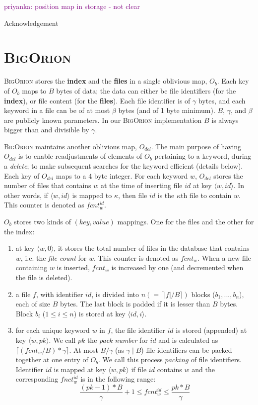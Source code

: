 \documentclass[sigconf]{acmart}
\newcommand{\priyanka}[1]{\textcolor{purple}{priyanka: #1}}
\newcommand{\pair}[2]{{\langle \ensuremath{#1, #2} \rangle}}
\newcommand{\vol}[1]{\lvert{#1}\rvert}
\newcommand{\ceil}[1]{\lceil #1 \rceil}
\newcommand{\BigOrion}{\textsc{BigOrion }}
\begin{document}
\priyanka{position map in storage - not clear}
\appendix


\begin{acks}
Acknowledgement
\end{acks}







\section{\BigOrion}
\BigOrion stores the \textbf{index} and the \textbf{files} in a single oblivious map, $O_{b}$. Each key of $O_{b}$ maps to $B$ bytes of data; the data can either be file identifiers (for the \textbf{index}), or file content (for the \textbf{files}). Each file identifier is of $\gamma$ bytes, and each keyword in a file can be of at most $\beta$ bytes (and of 1 byte minimum). $B$, $\gamma$, and $\beta$ are publicly known parameters. In our \BigOrion implementation $B$ is always bigger than and divisible by $\gamma$. 

\BigOrion maintains another oblivious map, $O_{del}$. The main purpose of having $O_{del}$ is to enable readjustments of elements of $O_{b}$ pertaining to a keyword, during a \emph{delete}; to make subsequent searches for the keyword efficient (details below). Each key of $O_{del}$ maps to a 4 byte integer.
For each keyword $w$, $O_{del}$ stores the number of files that contains $w$ at the time of inserting file $id$ at key $\pair{w}{id}$. In other words, if $\pair{w}{id}$ is mapped to $\kappa$, then file $id$ is the $\kappa$th file to contain $w$. This counter is denoted as $fcnt_w^{id}$.

$O_{b}$ stores two kinds of $(key,value)$ mappings. One for the files and the other for the index:
\begin{enumerate}
\item at key $\pair{w}{0}$, it stores the total number of files in the database that contains $w$, i.e. the \emph{file count} for $w$. This counter is denoted as $fcnt_w$.  When a new file containing $w$ is inserted, $fcnt_w$ is increased by one (and decremented when the file is deleted). 
    \item a file $f$, with identifier $id$, is divided into $n (=\ceil{\vol{f}/B})$ blocks ($b_1,...,b_n$), each of size $B$ bytes. The last block is padded if it is lesser than $B$ bytes. Block $b_i$ ($1 \leq i \leq n$) is stored at key $\pair{id}{i}$.
    
    \item for each unique keyword $w$ in $f$, the file identifier $id$ is stored (appended) at key $ \pair{w}{pk}$. We call $pk$ the \emph{pack number} for $id$ and is calculated as $\ceil{(fcnt_w/B)*\gamma}$. At most $B/\gamma$ (as $\gamma \mid B$) file identifiers can be packed together at one entry of $O_{b}$. We call this process $packing$ of file identifiers. Identifier $id$ is mapped at key $\pair{w}{pk}$ if file $id$ contains $w$ and the corresponding $fnct_w^{id}$ is in the following range:
    $$\frac{(pk-1)*B}{\gamma}+1 \leq fcnt_w^{id} \leq \frac{pk*B}{\gamma}$$ 
\end{enumerate}
\end{document}
